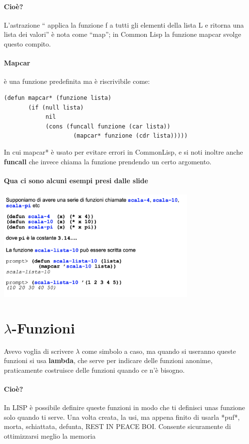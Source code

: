 \documentclass[12pt, a4paper, openany, oneside]{book}
\begin{document}
\paragraph{Cioè? }L’astrazione “ \color{red} applica la funzione f a tutti gli 
elementi della
lista L e ritorna una lista dei valori”\color{black} è nota come “map”; in
Common Lisp la 
funzione mapcar svolge questo compito.
\paragraph{Mapcar} è una funzione predefinita ma è riscrivibile come:
\begin{lstlisting}[language=LISP]
(defun mapcar* (funzione lista)
       (if (null lista)
			nil
			(cons (funcall funzione (car lista))
					(mapcar* funzione (cdr lista)))))	
\end{lstlisting}
In cui mapcar* è usato per evitare errori in CommonLisp, e si noti inoltre anche
\textbf{funcall} che invece chiama la funzione prendendo un certo argomento.
\paragraph{Qua ci sono alcuni esempi presi dalle slide}
\begin{center}
	\includegraphics[width=0.75\textwidth]{21}
\end{center}
\section{$\lambda$-Funzioni}
Avevo voglia di scrivere $\lambda$ come simbolo a caso, ma quando si useranno 
queste funzioni si usa \textbf{lambda}, che serve per indicare delle funzioni 
anonime, praticamente costruisce delle funzioni quando ce n'è bisogno.
\paragraph{Cioè? }In LISP è possibile definire queste funzioni in modo che ti 
definisci unas funzione solo quando ti serve. Una volta creata, la usi, ma appena
finito di usarla *puf*, morta, schiattata, defunta, REST IN PEACE BOI. Consente
sicuramente di ottimizzarsi meglio la memoria
\end{document}
